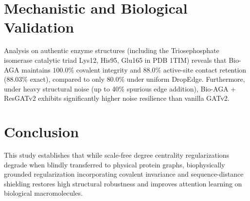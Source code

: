 \documentclass[10pt,journal,compsoc]{IEEEtran}
\begin{document}
\section{Mechanistic and Biological Validation}
Analysis on authentic enzyme structures (including the Triosephosphate isomerase catalytic triad Lys12, His95, Glu165 in PDB 1TIM) reveals that Bio-AGA maintains $100.0\%$ covalent integrity and $88.0\%$ active-site contact retention ($88.03\%$ exact), compared to only $80.0\%$ under uniform DropEdge. Furthermore, under heavy structural noise (up to 40\% spurious edge addition), Bio-AGA + ResGATv2 exhibits significantly higher noise resilience than vanilla GATv2.

\section{Conclusion}
This study establishes that while scale-free degree centrality regularizations degrade when blindly transferred to physical protein graphs, biophysically grounded regularization incorporating covalent invariance and sequence-distance shielding restores high structural robustness and improves attention learning on biological macromolecules.



\end{document}
